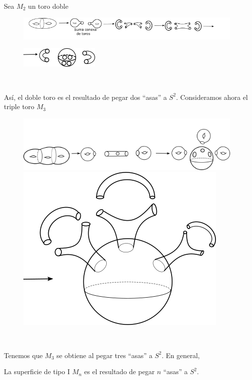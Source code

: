 \documentclass[GTS.tex]{subfiles}
\begin{document}
\begin{flushleft}\

Sea $M_2$ un toro doble

\begin{figure}[h!]
	\includegraphics[scale=0.9]{asa1ink}
\end{figure}
\begin{figure}[h!]
	\includegraphics[scale=0.9]{asa2ink}
\end{figure}\

Así, el doble toro es el resultado de pegar dos ``asas'' a $S^2$. Consideramos ahora el triple toro $M_3$
\begin{figure}[h!]
	\includegraphics[scale=0.9]{asa3ink}
	\includegraphics[scale=0.2]{asasesfera}
\end{figure}

\end{flushleft}\

Tenemos que $M_3$ se obtiene al pegar tres ``asas'' a $S^2$. En general,


\begin{teorema} La superficie de tipo I $M_n$ es el resultado de pegar $n$ ``asas'' a $S^2$.
\end{teorema}\
\end{document}
